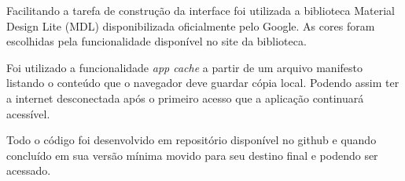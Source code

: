 Facilitando a tarefa de construção da interface foi utilizada a biblioteca Material Design Lite (MDL)\nocite{mdl} disponibilizada oficialmente pelo Google. As cores foram escolhidas pela funcionalidade disponível no site da biblioteca.

Foi utilizado a funcionalidade \textit{app cache} a partir de um arquivo manifesto listando o conteúdo que o navegador deve guardar cópia local. Podendo assim ter a internet desconectada após o primeiro acesso que a aplicação continuará acessível.

Todo o código foi desenvolvido em repositório disponível no github e quando concluído em sua versão mínima movido para seu destino final e podendo ser acessado.\nocite{bizual}\color{black}

\ifdraft{}{

%
%
%
%
%
%
%
%
%
}

